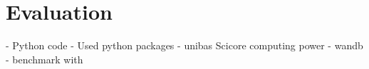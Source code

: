 \chapter{Evaluation}
\label{sec:graphDenoising}

- Python code
- Used python packages
- unibas Scicore computing power
- wandb\cite{wandb}
- benchmark with \cite{bm3d}